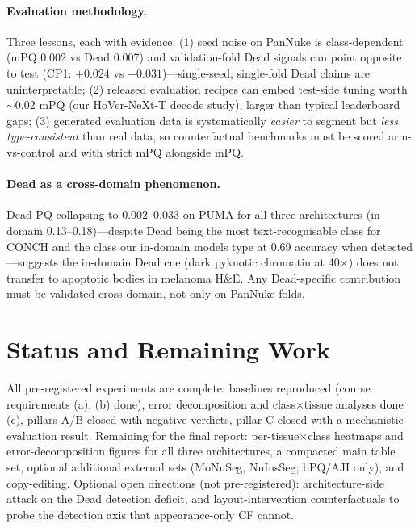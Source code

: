 \documentclass[11pt]{article}
\begin{document}
\paragraph{Evaluation methodology.} Three lessons, each with evidence: (1) seed noise on PanNuke is
class-dependent (mPQ 0.002 vs Dead 0.007) and validation-fold Dead signals can point opposite
to test (CP1: $+0.024$ vs $-0.031$)---single-seed, single-fold Dead claims are uninterpretable;
(2) released evaluation recipes can embed test-side tuning worth $\sim$0.02 mPQ (our
HoVer-NeXt-T decode study), larger than typical leaderboard gaps; (3) generated evaluation data
is systematically \emph{easier} to segment but \emph{less type-consistent} than real data, so
counterfactual benchmarks must be scored arm-vs-control and with strict mPQ alongside mPQ.

\paragraph{Dead as a cross-domain phenomenon.} Dead PQ collapsing to 0.002--0.033 on PUMA for
all three architectures (in domain 0.13--0.18)---despite Dead being the most text-recognisable
class for CONCH and the class our
in-domain models type at 0.69 accuracy when detected---suggests the in-domain Dead cue (dark
pyknotic chromatin at 40$\times$) does not transfer to apoptotic bodies in melanoma H\&E.
Any Dead-specific contribution must be validated cross-domain, not only on PanNuke folds.

\section{Status and Remaining Work}
\label{sec:status}

All pre-registered experiments are complete: baselines reproduced (course requirements (a),
(b) done), error decomposition and class$\times$tissue analyses done (c), pillars A/B closed
with negative verdicts, pillar C closed with a mechanistic evaluation result. Remaining for the
final report: per-tissue$\times$class heatmaps and error-decomposition figures for all three
architectures, a compacted main table set, optional additional external sets (MoNuSeg,
NuInsSeg; bPQ/AJI only), and copy-editing. Optional open directions (not pre-registered):
architecture-side attack on the Dead detection deficit, and layout-intervention counterfactuals
to probe the detection axis that appearance-only CF cannot.
\end{document}
